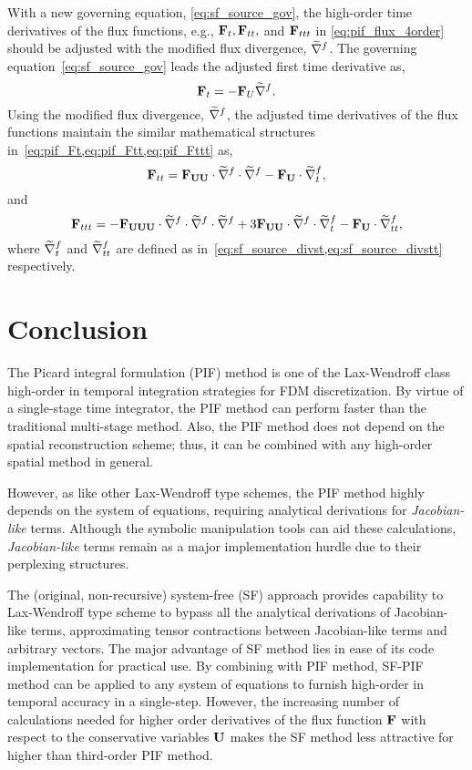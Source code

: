 With a new governing equation, \cref{eq:sf_source_gov},
the high-order time derivatives of the flux functions, e.g., \( \mathbf{F}_{t}, \mathbf{F}_{tt}, \) and \( \mathbf{F}_{ttt} \)
in \cref{eq:pif_flux_4order}
should be adjusted with the modified flux divergence, \( \widetilde{\nabla}^{f} \).
The governing equation~\cref{eq:sf_source_gov} leads
the adjusted first time derivative as,
\begin{equation}\label{eq:sf_source_Ft}
    \mathbf{F}_{t} = -\mathbf{F}_{U} \widetilde{\nabla}^{f}.
\end{equation}
Using the modified flux divergence, \( \widetilde{\nabla}^{f} \), the adjusted time derivatives of the flux functions
maintain the similar mathematical structures in~\cref{eq:pif_Ft,eq:pif_Ftt,eq:pif_Fttt} as,
\begin{equation}\label{eq:sf_source_Ftt}
    \mathbf{F}_{tt} = \mathbf{F}_{\mathbf{U} \mathbf{U}} \cdot \widetilde{\nabla}^{f} \cdot \widetilde{\nabla}^{f} - \mathbf{F}_{\mathbf{U}} \cdot \widetilde{\nabla}^{f}_{t},
\end{equation}
and
\begin{equation}\label{eq:sf_source_Fttt}
    \mathbf{F}_{ttt} = -\mathbf{F}_{\mathbf{U} \mathbf{U} \mathbf{U}} \cdot \widetilde{\nabla}^{f} \cdot \widetilde{\nabla}^{f} \cdot \widetilde{\nabla}^{f}
    + 3 \mathbf{F}_{\mathbf{U} \mathbf{U}} \cdot \widetilde{\nabla}^{f} \cdot \widetilde{\nabla}^{f}_{t}
    - \mathbf{F}_{\mathbf{U}} \cdot \widetilde{\nabla}^{f}_{tt},
\end{equation}
where \( \widetilde{\nabla}^{f}_{t} \) and \( \widetilde{\nabla}^{f}_{tt} \) are defined as in~\cref{eq:sf_source_divst,eq:sf_source_divstt} respectively.




\section{Conclusion}\label{sec:sf_conclusion}

The Picard integral formulation (PIF) method is one of the Lax-Wendroff class
high-order in temporal integration strategies for FDM discretization.
By virtue of a single-stage time integrator, the PIF method can perform
faster than the traditional multi-stage method.
Also, the PIF method does not depend on the spatial reconstruction scheme;
thus, it can be combined with any high-order spatial method in general.

However, as like other Lax-Wendroff type schemes,
the PIF method highly depends on the system of equations,
requiring analytical derivations for \textit{Jacobian-like} terms.
Although the symbolic manipulation tools can aid these calculations,
\textit{Jacobian-like} terms remain as a major implementation hurdle due to their perplexing structures.

The (original, non-recursive) system-free (SF) approach provides capability
to Lax-Wendroff type scheme to bypass all the analytical derivations of Jacobian-like terms,
approximating tensor contractions between Jacobian-like terms and arbitrary vectors.
The major advantage of SF method lies in ease of its code implementation for practical use.
By combining with PIF method, SF-PIF method can be applied to any system of equations
to furnish high-order in temporal accuracy in a single-step.
However, the increasing number of calculations needed for
higher order derivatives of the flux function \( \mathbf{F} \) with respect to the conservative variables \( \mathbf{U} \)
makes the SF method less attractive for higher than third-order PIF method.

